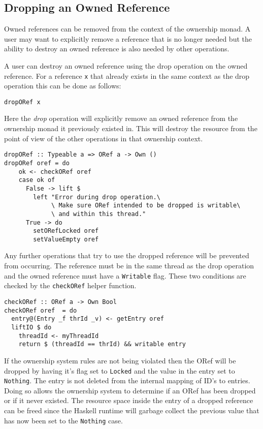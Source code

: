 \documentclass[onehalf,11pt]{beavtex}
\begin{document}
\subsection{Dropping an Owned Reference}

Owned references can be removed from the context of the ownership monad.
A user may want to explicitly remove a reference that is no longer needed but
the ability to destroy an owned reference is also needed by other operations.

A user can destroy an owned reference using the drop operation on the owned
reference. For a reference \texttt{x} that already exists in the same context
as the drop operation this can be done as follows:

\begin{verbatim}
dropORef x
\end{verbatim}

Here the \textit{drop} operation will explicitly remove an owned reference from
the ownership monad it previously existed in.
This will destroy the resource from the point of view of the other operations
in that ownership context.

\begin{verbatim}
dropORef :: Typeable a => ORef a -> Own ()
dropORef oref = do
    ok <- checkORef oref
    case ok of
      False -> lift $
        left "Error during drop operation.\
             \ Make sure ORef intended to be dropped is writable\
             \ and within this thread."
      True -> do
        setORefLocked oref
        setValueEmpty oref
\end{verbatim}

Any further operations that try to use the dropped reference will be prevented
from occurring.
The reference must be in the same thread as the drop operation and the owned
reference must have a \texttt{Writable} flag. These two conditions are checked
by the \texttt{checkORef} helper function.

\begin{verbatim}
checkORef :: ORef a -> Own Bool
checkORef oref  = do
  entry@(Entry _f thrId _v) <- getEntry oref
  liftIO $ do
    threadId <- myThreadId
    return $ (threadId == thrId) && writable entry
\end{verbatim}

If the ownership system rules are not being violated then the ORef will be
dropped by having it's flag set to \texttt{Locked} and the value in the
entry set to \texttt{Nothing}. The entry is not deleted from the internal mapping of
ID's to entries. Doing so allows the ownership system to determine if an ORef
has been dropped or if it never existed.
The resource space inside the entry of a dropped reference can be freed since
the Haskell runtime will garbage collect the previous value that has now been
set to the \texttt{Nothing} case.
\end{document}
